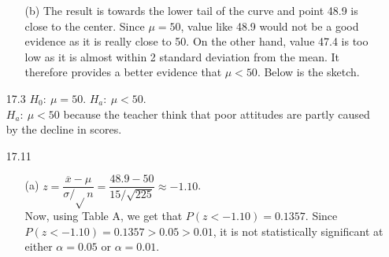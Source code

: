 \documentclass[11pt, a4paper]{article}
\begin{document}
\begin{itemize}
\begin{itemize}
\item[(b)]
The result is towards the lower tail of the curve and point 48.9
is close to the center. Since $\mu = 50$, value like 48.9 would
not be a good evidence as it is really close to 50. On the other hand,
value 47.4 is too low as it is almost within 2 standard deviation from the mean.
It therefore provides a better evidence that $\mu < 50$. Below is the sketch.
\item[]
\item[]
\begin{center}
\end{center}
\end{itemize}

\item[]
\item[]

\item[17.3]
$H_0: \ \mu =  50$. $H_a: \ \mu < 50$.\\
$H_a: \ \mu < 50$ because the teacher think that poor attitudes are partly caused by the decline in scores.

\newpage

\item[17.11]
\begin{itemize}
\item[(a)]
$z = \displaystyle\dfrac{\overline{x} - \mu}{\sigma/\sqrt{}n} = \displaystyle\dfrac{48.9 - 50}{15/\sqrt{225}} \approx -1.10$.\\
Now, using Table A, we get that $P(z < -1.10) = 0.1357$. Since $P(z < -1.10) = 0.1357 > 0.05 > 0.01$,
it is not statistically significant at either $\alpha = 0.05$ or $\alpha = 0.01$.

\item[]


\end{itemize}
\end{itemize}
\end{document}
